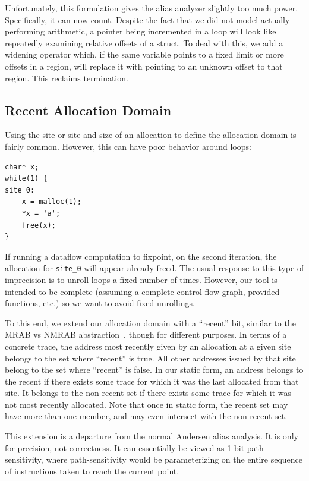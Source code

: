 Unfortunately, this formulation gives the alias analyzer slightly too much power.
Specifically, it can now count.
Despite the fact that we did not model actually performing arithmetic, a pointer being incremented in a loop will look like repeatedly examining relative offsets of a struct.
To deal with this, we add a widening operator which, if the same variable points to a fixed limit or more offsets in a region, will replace it with pointing to an unknown offset to that region.
This reclaims termination.

\subsection{Recent Allocation Domain}
\label{sec:effects}
Using the site or site and size of an allocation to define the allocation domain is fairly common.
However, this can have poor behavior around loops:

\begin{lstlisting}
char* x;
while(1) {
site_0:
	x = malloc(1);
	*x = 'a';
	free(x);
}
\end{lstlisting}

If running a dataflow computation to fixpoint, on the second
iteration, the allocation for \texttt{site\_0} will appear already
freed.  The usual response to this type of imprecision is to unroll
loops a fixed number of times.  However, our tool is intended to be
complete (assuming a complete control flow graph, provided functions,
etc.) so we want to avoid fixed unrollings.

To this end, we extend our allocation domain with a ``recent'' bit,
similar to the MRAB vs NMRAB abstraction~\cite{vsa}, though for different
purposes.  In terms of a concrete trace, the address most recently
given by an allocation at a given site belongs to the set where
``recent'' is true.  All other addresses issued by that site belong to
the set where ``recent'' is false.  In our static form, an address
belongs to the recent if there exists some trace for which it was the
last allocated from that site.  It belongs to the non-recent set if
there exists some trace for which it was not most recently allocated.
Note that once in static form, the recent set may have more than one
member, and may even intersect with the non-recent set.

This extension is a departure from the normal Andersen alias analysis.
It is only for precision, not correctness.
It can essentially be viewed as 1 bit path-sensitivity, where path-sensitivity would be parameterizing on the entire sequence of instructions taken to reach the current point.

